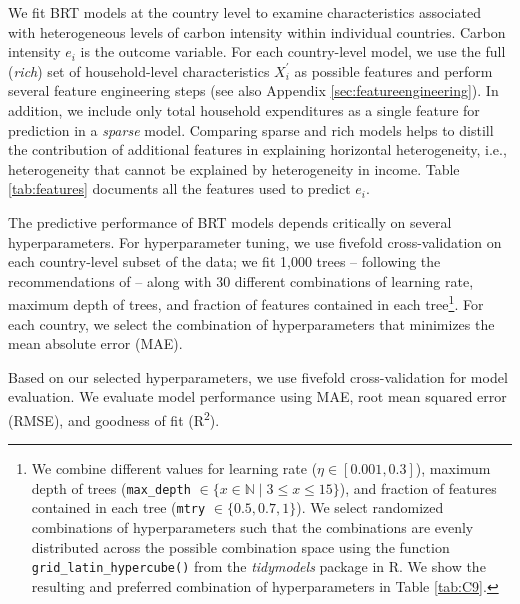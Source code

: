 \documentclass[12pt, a4paper]{article}
\begin{document}
We fit BRT models at the country level to examine characteristics associated with heterogeneous levels of carbon intensity within individual countries. Carbon intensity $e_{i}$ is the outcome variable. For each country-level model, we use the full (\textit{rich}) set of household-level characteristics $X_{i}^{'}$ as possible features and perform several feature engineering steps (see also Appendix \ref{sec:featureengineering}). In addition, we include only total household expenditures as a single feature for prediction in a \textit{sparse} model. Comparing sparse and rich models helps to distill the contribution of additional features in explaining horizontal heterogeneity, i.e., heterogeneity that cannot be explained by heterogeneity in income. Table \ref{tab:features} documents all the features used to predict $e_{i}$.



The predictive performance of BRT models depends critically on several hyperparameters. For hyperparameter tuning, we use fivefold cross-validation on each country-level subset of the data; we fit 1,000 trees -- following the recommendations of \textcite{Elith.2008} -- along with 30 different combinations of learning rate, maximum depth of trees, and fraction of features contained in each tree\footnote{We combine different values for learning rate ($\eta \in [0.001,0.3]$), maximum depth of trees (\texttt{max\_depth} $\in \{x \in \mathbb{N} \mid 3  \leq x \leq 15 \}$), and fraction of features contained in each tree (\texttt{mtry} $\in \{0.5,0.7,1\}$). We select randomized combinations of hyperparameters such that the combinations are evenly distributed across the possible combination space using the function \texttt{grid\_latin\_hypercube()} from the \textit{tidymodels} package in R. We show the resulting and preferred combination of hyperparameters in Table \ref{tab:C9}.}. For each country, we select the combination of hyperparameters that minimizes the mean absolute error (MAE).

Based on our selected hyperparameters, we use fivefold cross-validation for model evaluation. We evaluate model performance using MAE, root mean squared error (RMSE), and goodness of fit (R\textsuperscript{2}). 
\end{document}
